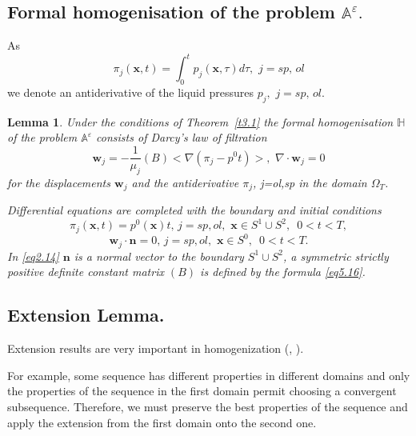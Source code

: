 \documentclass{article}
\theoremstyle{plain}
\newtheorem{lemma}[theorem]{Lemma}
\theoremstyle{definition}
\numberwithin{equation}{section}
\begin{document}
\subsection{Formal homogenisation of the problem $\mathbb{A}^{\varepsilon}.$}

As \begin{equation}\label{eq2.12}
{\pi}_{j}(\boldsymbol{x},t)=\int_{0}^{t}{p}_{j}(\boldsymbol{x},\tau)d\tau,\,\,j=sp,\,ol
\end{equation}
we denote an antiderivative of the liquid pressures ${p_{j}},\,\,j=sp,\,ol$.  

\begin{lemma}\label{l2.12}
Under the conditions of Theorem~\ref{t3.1} the formal homogenisation $\mathbb{H}$ of the problem $\mathbb{A}^{\varepsilon}$ consists of Darcy's law of filtration
\begin{equation}\label{eq2.13}
\boldsymbol{w}_{j}=-\frac{1}{\mu_{j}}(B)<\nabla(\pi_{j}-{p}^{0}t)>,\,\,
\nabla\cdot\boldsymbol{w}_{j}=0
\end{equation}
for the displacements $\boldsymbol{w}_{j}$ and the antiderivative ${\pi}_{j}$, \emph{j=ol,sp}
in the domain $\Omega_{T}$.

Differential equations are completed with the boundary and initial conditions
\begin{equation}\label{eq2.14}
{\pi}_{j}(\boldsymbol{x},t)={p}^{0}(\boldsymbol{x})t,\,j=sp,ol,\,\,
\boldsymbol{x}\in{S}^{1}\cup{S}^{2},\,\,\,0<t<T,
\end{equation}
\begin{equation}\label{eq2.15}
\boldsymbol{w}_{j}\cdot\boldsymbol{n}=0,\,j=sp,ol,\,\,\boldsymbol{x}\in{S}^{0},\,\,\,0<t<T.
\end{equation}
In \eqref{eq2.14} $\boldsymbol{n}$ is a normal vector to the boundary ${S}^{1}\cup{S}^{2}$, a symmetric strictly positive definite constant matrix $(B)$ is defined by the formula \eqref{eq5.16}.
\end{lemma}

\subsection{Extension Lemma.}

Extension results are very important in homogenization (\cite{6}, \cite{22}).

For example, some sequence has different properties in different domains and only the properties of the sequence in the first domain permit choosing a convergent subsequence. Therefore, we must preserve the best properties of the sequence and apply the extension from the first domain onto the second one.
\end{document}
